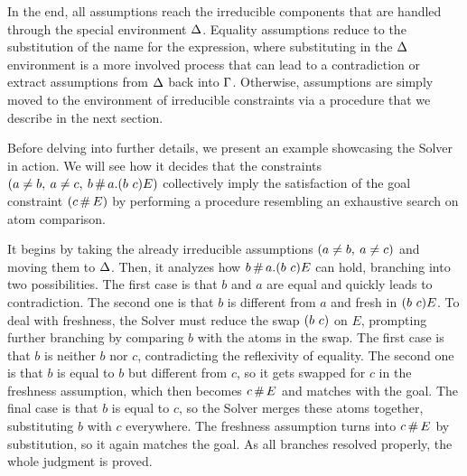 \documentclass[english, mgr]{iithesis}
\begin{document}
In the end, all assumptions reach the irreducible components that are handled through
the special environment $\Delta$.
Equality assumptions reduce to the substitution of the name for the expression, where
substituting in the $\Delta$ environment is a more involved process
that can lead to a contradiction or extract assumptions from $\Delta$ back into $\Gamma$.
Otherwise, assumptions are simply moved to the environment of irreducible
constraints via a procedure that we describe in the next section.

Before delving into further details, we present an example showcasing the Solver in action.
We will see how it decides that the constraints $(a \neq b,\: a \neq c,\: b \,\#\, a.(b\ c) E)$
collectively imply the satisfaction of the goal constraint $(c \,\#\, E)$
by performing a procedure resembling an exhaustive search on atom comparison.

It begins by taking the already irreducible assumptions $(a \neq b,\: a \neq c)$ and moving them to $\Delta$.
Then, it analyzes how $b \,\#\, a.(b\ c) E$
can hold, branching into two possibilities.
The first case is that $b$ and $a$ are equal and quickly leads to contradiction.
The second one is that $b$ is different from $a$ and fresh in $(b\ c) E$.
To deal with freshness, the Solver must reduce the swap $\permswap{b}{c}$ on $E$,
prompting further branching by comparing $b$ with the atoms in the swap.
The first case is that $b$ is neither $b$ nor $c$, contradicting the reflexivity of equality.
The second one is that $b$ is equal to $b$ but different from $c$, so it gets swapped for $c$
in the freshness assumption, which then becomes $c \,\#\, E$ and matches with the goal.
The final case is that $b$ is equal to $c$, so the Solver merges these atoms together,
substituting $b$ with $c$ everywhere.
The freshness assumption turns into $c \,\#\, E$ by substitution, so it again matches the goal.
As all branches resolved properly, the whole judgment is proved.
\end{document}
